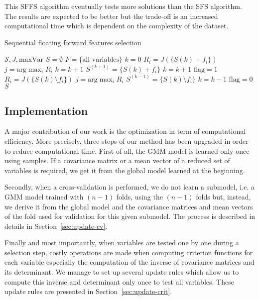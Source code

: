 \documentclass[a4paper,11pt,DIV=16]{scrartcl}
\begin{document}
    This SFFS algorithm eventually tests more solutions than the SFS algorithm. The results are expected to be better but the trade-off is an increased computational time which is dependent on the complexity of the dataset.

    \begin{algorithm}
    \caption{Sequential floating forward features selection\label{alg:sffs}}
    {\fontsize{10}{10}\selectfont
    \begin{algorithmic}[1]
    \REQUIRE $\mathcal{S},J,\text{maxVar}$
    \STATE $S=\emptyset$
    \STATE $F=\text{\{all variables\}}$
    \STATE $k=0$
    \STATE $R_i = J(\{S{(k)} + f_i\})$
    \ENDFOR
    \STATE $j=\text{arg} \max_{i} R_i$
    \STATE $k=k+1$
    \ELSE
    \STATE $S^{(k+1)} = \{S{(k)} + f_i\}$
    \STATE $k=k+1$
    \STATE $\text{flag}=1$
    \STATE $R_i = J(\{S{(k)}\setminus f_i\})$
    \ENDFOR
    \STATE $j=\text{arg} \max_{i} R_i$
    \STATE $S^{(k-1)} = \{S{(k)} \setminus f_i\}$
    \STATE $k=k-1$
    \ELSE
    \STATE $\text{flag}=0$
    \ENDIF
    \ENDWHILE
    \ENDIF
    \ENDWHILE
    \RETURN $S$
    \end{algorithmic}
    }
    \end{algorithm}

    \subsection{Implementation}
    A major contribution of our work is the optimization in term of computational efficiency. More precisely, three steps of our method has been upgraded in order to reduce computational time. First of all, the GMM model is learned only once using samples. If a covariance matrix or a mean vector of a reduced set of variables is required, we get it from the global model learned at the beginning.

    Secondly, when a cross-validation is performed, we do not learn a submodel, i.e. a GMM model trained with $(n-1)$ folds, using the $(n-1)$ folds but, instead, we derive it from the global model and the covariance matrices and mean vectors of the fold used for validation for this given submodel. The process is described in details in Section~\ref{sec:update-cv}.

    Finally and most importantly, when variables are tested one by one during a selection step, costly operations are made when computing criterion functions for each variable especially the computation of the inverse of covariance matrices and its determinant. We manage to set up several update rules which allow us to compute this inverse and determinant only once to test all variables. These update rules are presented in Section~\ref{sec:update-crit}.
\end{document}

